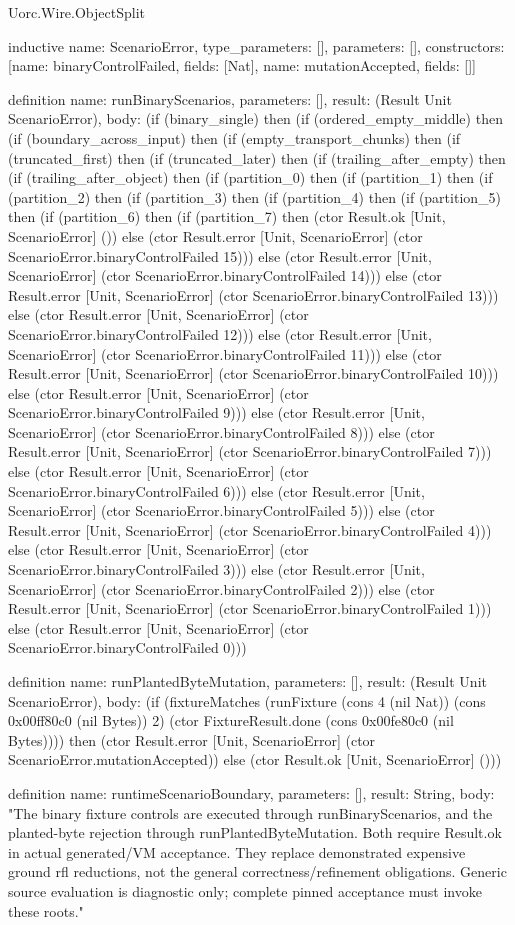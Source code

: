 \begin{lexlean}{Uorc.Wire.ObjectSplit}
\begin{semanticmodule}
inductive{
  name: ScenarioError,
  type_parameters: [],
  parameters: [],
  constructors: [{name: binaryControlFailed, fields: [Nat]}, {name: mutationAccepted, fields: []}]
}

definition{
  name: runBinaryScenarios,
  parameters: [],
  result: (Result Unit ScenarioError),
  body: (if (binary_single) then (if (ordered_empty_middle) then (if (boundary_across_input) then (if (empty_transport_chunks) then (if (truncated_first) then (if (truncated_later) then (if (trailing_after_empty) then (if (trailing_after_object) then (if (partition_0) then (if (partition_1) then (if (partition_2) then (if (partition_3) then (if (partition_4) then (if (partition_5) then (if (partition_6) then (if (partition_7) then (ctor Result.ok [Unit, ScenarioError] ()) else (ctor Result.error [Unit, ScenarioError] (ctor ScenarioError.binaryControlFailed 15))) else (ctor Result.error [Unit, ScenarioError] (ctor ScenarioError.binaryControlFailed 14))) else (ctor Result.error [Unit, ScenarioError] (ctor ScenarioError.binaryControlFailed 13))) else (ctor Result.error [Unit, ScenarioError] (ctor ScenarioError.binaryControlFailed 12))) else (ctor Result.error [Unit, ScenarioError] (ctor ScenarioError.binaryControlFailed 11))) else (ctor Result.error [Unit, ScenarioError] (ctor ScenarioError.binaryControlFailed 10))) else (ctor Result.error [Unit, ScenarioError] (ctor ScenarioError.binaryControlFailed 9))) else (ctor Result.error [Unit, ScenarioError] (ctor ScenarioError.binaryControlFailed 8))) else (ctor Result.error [Unit, ScenarioError] (ctor ScenarioError.binaryControlFailed 7))) else (ctor Result.error [Unit, ScenarioError] (ctor ScenarioError.binaryControlFailed 6))) else (ctor Result.error [Unit, ScenarioError] (ctor ScenarioError.binaryControlFailed 5))) else (ctor Result.error [Unit, ScenarioError] (ctor ScenarioError.binaryControlFailed 4))) else (ctor Result.error [Unit, ScenarioError] (ctor ScenarioError.binaryControlFailed 3))) else (ctor Result.error [Unit, ScenarioError] (ctor ScenarioError.binaryControlFailed 2))) else (ctor Result.error [Unit, ScenarioError] (ctor ScenarioError.binaryControlFailed 1))) else (ctor Result.error [Unit, ScenarioError] (ctor ScenarioError.binaryControlFailed 0)))
}

definition{
  name: runPlantedByteMutation,
  parameters: [],
  result: (Result Unit ScenarioError),
  body: (if (fixtureMatches (runFixture (cons 4 (nil Nat)) (cons 0x00ff80c0 (nil Bytes)) 2) (ctor FixtureResult.done (cons 0x00fe80c0 (nil Bytes)))) then (ctor Result.error [Unit, ScenarioError] (ctor ScenarioError.mutationAccepted)) else (ctor Result.ok [Unit, ScenarioError] ()))
}

definition{
  name: runtimeScenarioBoundary,
  parameters: [],
  result: String,
  body: "The binary fixture controls are executed through runBinaryScenarios, and the planted-byte rejection through runPlantedByteMutation. Both require Result.ok in actual generated/VM acceptance. They replace demonstrated expensive ground rfl reductions, not the general correctness/refinement obligations. Generic source evaluation is diagnostic only; complete pinned acceptance must invoke these roots."
}
\end{semanticmodule}
\end{lexlean}
